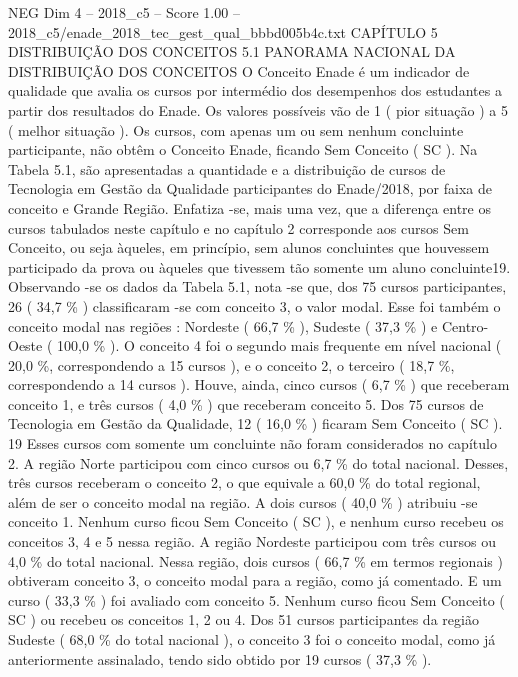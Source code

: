 \begin{textsample}{NEG Dim 4 – 2018\_c5 – Score 1.00 – 2018\_c5/enade\_2018\_tec\_gest\_qual\_bbbd005b4c.txt}  \label{ex:f4_neg_139}
CAPÍTULO 5 DISTRIBUIÇÃO DOS CONCEITOS 5.1 PANORAMA NACIONAL DA DISTRIBUIÇÃO DOS CONCEITOS O Conceito Enade é um indicador de qualidade que avalia os cursos por intermédio dos desempenhos dos estudantes a partir dos resultados do Enade.
Os valores possíveis vão de 1 ( pior situação ) a 5 ( melhor situação ).
Os cursos, com apenas um ou sem nenhum concluinte participante, não obtêm o Conceito Enade, ficando Sem Conceito ( SC ).
Na Tabela 5.1, são apresentadas a quantidade e a distribuição de cursos de Tecnologia em Gestão da Qualidade participantes do Enade/2018, por faixa de conceito e Grande Região.
Enfatiza -se, mais uma vez, que a diferença entre os cursos tabulados neste capítulo e no capítulo 2 corresponde aos cursos Sem Conceito, ou seja àqueles, em princípio, sem alunos concluintes que houvessem participado da prova ou àqueles que tivessem tão somente um aluno concluinte19.
Observando -se os dados da Tabela 5.1, nota -se que, dos 75 cursos participantes, 26 ( 34,7 \% ) classificaram -se com conceito 3, o valor modal.
Esse foi também o conceito modal nas regiões : Nordeste ( 66,7 \% ), Sudeste ( 37,3 \% ) e Centro-Oeste ( 100,0 \% ).
O conceito 4 foi o segundo mais frequente em nível nacional ( 20,0 \%, correspondendo a 15 cursos ), e o conceito 2, o terceiro ( 18,7 \%, correspondendo a 14 cursos ).
Houve, ainda, cinco cursos ( 6,7 \% ) que receberam conceito 1, e três cursos ( 4,0 \% ) que receberam conceito 5.
Dos 75 cursos de Tecnologia em Gestão da Qualidade, 12 ( 16,0 \% ) ficaram Sem Conceito ( SC ). 19 Esses cursos com somente um concluinte não foram considerados no capítulo 2.
A região Norte participou com cinco cursos ou 6,7 \% do total nacional.
Desses, três cursos receberam o conceito 2, o que equivale a 60,0 \% do total regional, além de ser o conceito modal na região.
A dois cursos ( 40,0 \% ) atribuiu -se conceito 1.
Nenhum curso ficou Sem Conceito ( SC ), e nenhum curso recebeu os conceitos 3, 4 e 5 nessa região.
A região Nordeste participou com três cursos ou 4,0 \% do total nacional.
Nessa região, dois cursos ( 66,7 \% em termos regionais ) obtiveram conceito 3, o conceito modal para a região, como já comentado.
E um curso ( 33,3 \% ) foi avaliado com conceito 5.
Nenhum curso ficou Sem Conceito ( SC ) ou recebeu os conceitos 1, 2 ou 4.
Dos 51 cursos participantes da região Sudeste ( 68,0 \% do total nacional ), o conceito 3 foi o conceito modal, como já anteriormente assinalado, tendo sido obtido por 19 cursos ( 37,3 \% ).

\end{textsample}
